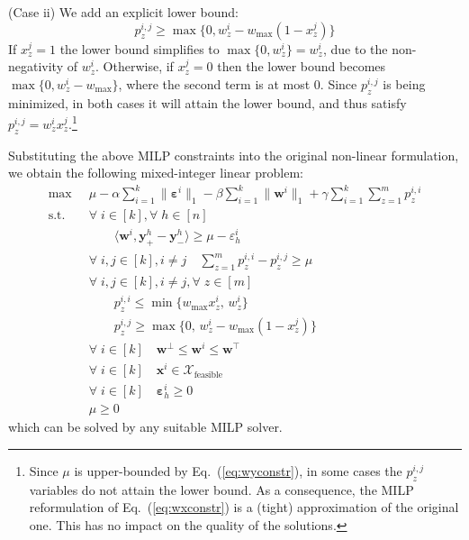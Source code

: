 \documentclass{article}
\renewcommand\[{\begin{equation}}
\renewcommand\]{\end{equation}}
\newcommand{\calvar}[1]{\ensuremath{\mathcal{#1}}}
\newcommand{\calX}{\calvar{X}}
\newcommand{\vecvar}[1]{\ensuremath{\boldsymbol{#1}}}
\newcommand{\vw}{\vecvar{w}}
\newcommand{\vx}{\vecvar{x}}
\newcommand{\vy}{\vecvar{y}}
\newcommand{\veps}{\vecvar{\varepsilon}}
\begin{document}
(Case ii) We add an explicit lower bound:
%
$$ p^{i,j}_z \ge \max \{ 0, w^{i}_z - w_\text{max}(1 - x^{j}_z) \} $$
%
If $x^j_z = 1$ the lower bound simplifies to $\max \{ 0, w^{i}_z \} = w^{i}_z$,
due to the non-negativity of $w^i_z$. Otherwise, if $x^j_z = 0$
then the lower bound becomes $\max \{ 0, w^{i}_z - w_\text{max} \}$, where
the second term is at most $0$. Since $p^{i,j}_z$ is being minimized, in both
cases it will attain the lower bound, and thus satisfy $p^{i,j}_z = w^i_z
x^j_z$.\footnote{Since $\mu$ is upper-bounded by Eq.~(\ref{eq:wyconstr}), in some
cases the $p^{i,j}_z$ variables do not attain the lower bound. As a
consequence, the MILP reformulation of Eq.~(\ref{eq:wxconstr}) is a (tight)
approximation of the original one. This has no impact on the quality of the
solutions.}

Substituting the above MILP constraints into the original non-linear
formulation, we obtain the following mixed-integer linear problem:
%
{\footnotesize
\begin{align}
    \max
        & \;\; \mu - \alpha \sum_{i=1}^k \| \veps^{i} \|_1 - \beta \sum_{i=1}^k \| \vw^{i} \|_1 + \gamma \sum_{i=1}^k \sum_{z=1}^m p^{i,i}_z
        \nonumber
    \\
    \text{s.t.}
        & \;\; \forall \; i \in [k], \forall \; h \in [n] \nonumber
    \\
        & \;\; \qquad \langle \vw^{i}, \vy^{h}_+ - \vy^{h}_- \rangle \ge \mu - \varepsilon^{i}_h \nonumber
    \\
        & \;\; \forall \; i, j \in [k], i \neq j \quad \sum_{z=1}^m p^{i,i}_z - p^{i,j}_z \ge \mu
    \\
        & \;\; \forall \; i, j \in [k], i \neq j, \forall \; z \in [m] \nonumber
    \\
        & \;\; \qquad p^{i,i}_z \le \min \{ w_\text{max} x^{i}_z, \, w^{i}_z \}
    \\
        & \;\; \qquad p^{i,j}_z \ge \max \{ 0, \, w^{i}_z - w_\text{max}(1 - x^{j}_z) \}
    \\
        & \;\; \forall \; i \in [k] \quad \vw^\bot \le \vw^{i} \le \vw^\top \label{eq:wbounds2}
    \\
        & \;\; \forall \; i \in [k] \quad \vx^{i} \in \calX_{\text{feasible}} \nonumber
    \\
        & \;\; \forall \; i \in [k] \quad \veps^{i}_h \ge 0 \nonumber
    \\
        & \;\; \mu \ge 0 \nonumber
\end{align}
}
%
which can be solved by any suitable MILP solver.
\end{document}
